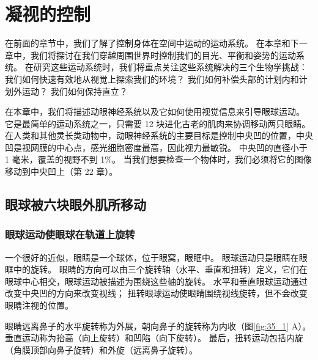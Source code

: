 \chapter{凝视的控制} \label{chap:chap35}

在前面的章节中，我们了解了控制身体在空间中运动的运动系统。
在本章和下一章中，我们将探讨在我们穿越周围世界时控制我们的目光、平衡和姿势的运动系统。
在研究这些运动系统时，我们将重点关注这些系统解决的三个生物学挑战：
我们如何快速有效地从视觉上探索我们的环境？
我们如何补偿头部的计划内和计划外运动？
我们如何保持直立？


在本章中，我们将描述动眼神经系统以及它如何使用视觉信息来引导眼球运动。
它是最简单的运动系统之一，只需要 12 块进化古老的肌肉来协调移动两只眼睛。
在人类和其他灵长类动物中，动眼神经系统的主要目标是控制中央凹的位置，中央凹是视网膜的中心点，感光细胞密度最高，因此视力最敏锐。
中央凹的直径小于 1 毫米，覆盖的视野不到 1\%。
当我们想要检查一个物体时，我们必须将它的图像移动到中央凹上（第 22 章）。


\section{眼球被六块眼外肌所移动}

\subsection{眼球运动使眼球在轨道上旋转}

一个很好的近似，眼睛是一个球体，位于眼窝，眼眶中。
眼球运动只是眼睛在眼眶中的旋转。
眼睛的方向可以由三个旋转轴（水平、垂直和扭转）定义，它们在眼球中心相交，眼球运动被描述为围绕这些轴的旋转。
水平和垂直眼球运动通过改变中央凹的方向来改变视线； 扭转眼球运动使眼睛围绕视线旋转，但不会改变眼睛注视的位置。


眼睛远离鼻子的水平旋转称为外展，朝向鼻子的旋转称为内收（图\ref{fig:35_1} A）。 
垂直运动称为抬高（向上旋转）和凹陷（向下旋转）。 最后，扭转运动包括内旋（角膜顶部向鼻子旋转）和外旋（远离鼻子旋转）。


